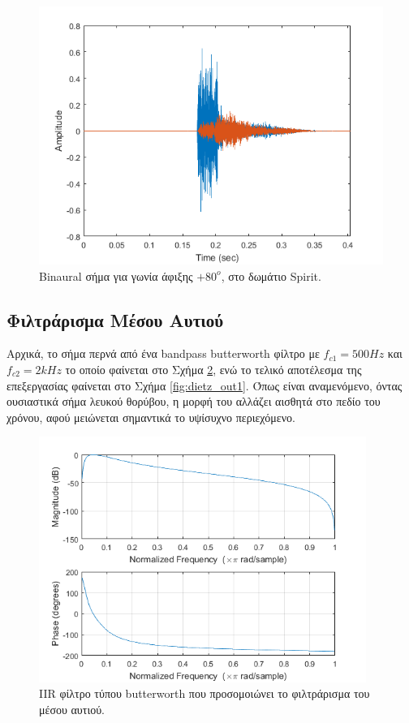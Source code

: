 \begin{figure}[h]
  \centering
  \includegraphics[width=\textwidth]{images/example_bin_sig.png}
  \caption{Binaural σήμα για γωνία άφιξης $+80^o$, στο δωμάτιο Spirit.}
  \label{fig:dietz_out}
\end{figure}

\subsection{Φιλτράρισμα Μέσου Αυτιού}

Αρχικά, το σήμα περνά από ένα bandpass butterworth φίλτρο με $f_{c1} = 500 Hz$ και $f_{c2} = 2 kHz$ το οποίο φαίνεται στο Σχήμα \ref{fig:butterworth_dietz_1}, ενώ το τελικό αποτέλεσμα της επεξεργασίας φαίνεται στο Σχήμα \ref{fig:dietz_out1}. Όπως είναι αναμενόμενο, όντας ουσιαστικά σήμα λευκού θορύβου, η μορφή του αλλάζει αισθητά στο πεδίο του χρόνου, αφού μειώνεται σημαντικά το υψίσυχνο περιεχόμενο.

\begin{figure}[h!]
  \centering
  \includegraphics[width=\textwidth,height=8cm]{images/butterworth_dietz_1.png}
  \caption{IIR φίλτρο τύπου butterworth που προσομοιώνει το φιλτράρισμα του μέσου αυτιού.}
  \label{fig:butterworth_dietz_1}
\end{figure}

